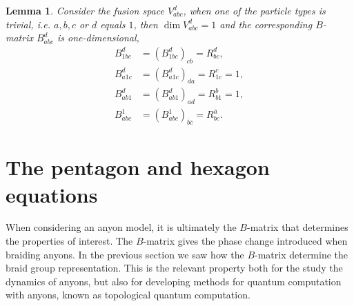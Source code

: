 \documentclass[a4paper,10pt,oneside]{book}
\theoremstyle{plain}
\newtheorem{lemma}[theorem]{Lemma}
\theoremstyle{definition}
\theoremstyle{remark}
\begin{document}
\begin{lemma}\label{res:B1}
  Consider the fusion space $V_{abc}^d$, when one of the particle types is trivial, i.e. $a,b,c$ or $d$ equals $1$, then $\dim V_{abc}^d = 1$ and the corresponding $B$-matrix $B_{abc}^d$ is one-dimensional,
  \begin{align*}
    B_{1bc}^d &= \left( B_{1bc}^d \right)_{c b} = R_{bc}^d, \\
    B_{a1c}^d &= \left( B_{a1c}^d \right)_{d a} = R_{1c}^c = 1, \\
    B_{ab1}^d &= \left( B_{ab1}^d \right)_{a d} = R_{b1}^b = 1, \\
    B_{abc}^1 &= \left( B_{abc}^1 \right)_{\overline{b} \overline{c}} = R_{bc}^{\overline{a}}.
  \end{align*}
\end{lemma}















































\section{The pentagon and hexagon equations}\label{sec:pentagon hexagon}

When considering an anyon model, it is ultimately the $B$-matrix that determines the properties of interest. The $B$-matrix gives the phase change introduced when braiding anyons. In the previous section we saw how the $B$-matrix determine the braid group representation. This is the relevant property both for the study the dynamics of anyons, but also for developing methods for quantum computation with anyons, known as topological quantum computation.
\end{document}
